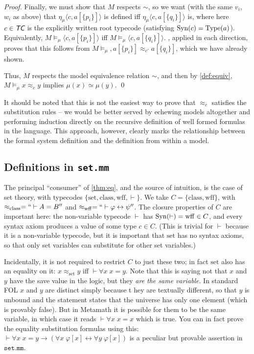 \documentclass[runningheads,a4paper]{llncs}
\newcommand{\tc}{\textit{\textsf{TC}}} %
\newcommand{\ang}[1]{\langle#1\rangle}
\newcommand{\vph}{\varphi}
\newcommand{\type}{{\rm Type}}
\newcommand{\syn}{{\rm Syn}}
\begin{document}
\begin{proof}
Finally, we must show that $M$ respects $\sim$, so we want (with the same $v_i$, $w_i$ as above) that $\eta_\mu\ang{c,a[\{p_i\}]}$ is defined iff $\eta_\mu\ang{c,a[\{q_i\}]}$ is, where here $c\in\tc$ is the explicitly written root typecode (satisfying $\syn(c)=\type(a)$). Equivalently, $M\models_\mu \ang{c,a[\{p_i\}]}$ iff $M\models_\mu\ang{c,a[\{q_i\}]}$.  , applied in each direction, proves that this follows from  $M\models_\mu,a[\{p_i\}]\approx_{c'} a[\{q_i\}]$, which we have already shown.

Thus, $M$ respects the model equivalence relation $\sim$, and then by \autoref{def:equiv}, $M\models_\mu x\approx_c y$ implies $\mu(x)\simeq\mu(y)$.
\qed\end{proof}

\begin{remark}
It should be noted that this is not the easiest way to prove that $\approx_c$ satisfies the substitution rules -- we would be better served by echewing models altogether and performing induction directly on the recursive definition of well formed formulas in the language. This approach, however, clearly marks the relationship between the formal system definition and the definition from within a model.
\end{remark}

\subsection{Definitions in \texttt{set.mm}}

\begin{remark}\label{rem:set-eq}
The principal ``consumer'' of \autoref{thm:eq}, and the source of intuition, is the case of set theory, with typecodes $\{\mathrm{set},\mathrm{class},\mathrm{wff},\vdash\}$. We take $C=\{\mathrm{class},\mathrm{wff}\}$, with $\approx_\mathrm{class}=``\vdash A=B''$ and $\approx_\mathrm{wff}=``\vdash \vph\leftrightarrow\psi''$. The closure properties of $C$ are important here: the non-variable typecode $\vdash$ has $\syn(\vdash)=\mathrm{wff}\in C$, and every syntax axiom produces a value of some type $c\in C$. (This is trivial for $\vdash$ because it is a non-variable typecode, but it is important that $\mathrm{set}$ has no syntax axioms, so that only set variables can substitute for other set variables.)
\end{remark}

Incidentally, it is not required to restrict $C$ to just these two; in fact $\mathrm{set}$ also has an equality on it: $x\approx_\mathrm{set} y$ iff $\vdash\forall x\;x=y$. Note that this is saying not that $x$ and $y$ have the save value in the logic, but they {\em are the same variable}. In standard FOL $x$ and $y$ are distinct simply because t
hey are textually different, so that $y$ is unbound and the statement states that the universe has only one element (which is provably false). But in Metamath it is possible for them to be the same variable, in which case it reads $\vdash\forall x\;x=x$ which is true. You can in fact prove the equality substitution formulas using this: $\vdash\forall x\;x=y\to(\forall x\;\vph[x]\leftrightarrow\forall y\;\vph[x])$ is a peculiar but provable assertion in $\texttt{set.mm}$.
\end{document}
